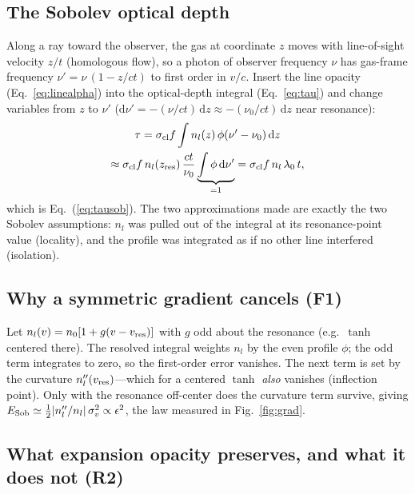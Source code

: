 \documentclass[fleqn,usenatbib]{mnras}
\begin{document}
\subsection{The Sobolev optical depth}
\label{app:sobolev}

Along a ray toward the observer, the gas at coordinate $z$ moves with
line-of-sight velocity $z/t$ (homologous flow), so a photon of observer
frequency $\nu$ has gas-frame frequency
$\nu' = \nu\,(1 - z/ct)$ to first order in $v/c$. Insert the line opacity
(Eq.~\ref{eq:linealpha}) into the optical-depth integral
(Eq.~\ref{eq:tau}) and change variables from $z$ to $\nu'$
($\mathrm{d}\nu' = -(\nu/ct)\,\mathrm{d}z \approx -(\nu_0/ct)\,\mathrm{d}z$
near resonance):
\begin{multline}
  \tau
  = \sigma_{\rm cl} f \int n_l(z)\, \phi(\nu'-\nu_0)\, \mathrm{d}z \\
  \approx
  \sigma_{\rm cl} f\, n_l(z_{\rm res})\, \frac{ct}{\nu_0}
  \underbrace{\int \phi\, \mathrm{d}\nu'}_{=1}
  = \sigma_{\rm cl} f\, n_l\, \lambda_0\, t ,
\end{multline}
which is Eq.~(\ref{eq:tausob}). The two approximations made are exactly the
two Sobolev assumptions: $n_l$ was pulled out of the integral at its
resonance-point value (locality), and the profile was integrated as if no
other line interfered (isolation).

\subsection{Why a symmetric gradient cancels (F1)}
\label{app:symmetry}

Let $n_l(v) = n_0[1 + g(v - v_{\rm res})]$ with $g$ odd about the resonance
(e.g.\ $\tanh$ centered there). The resolved integral weights $n_l$ by the
even profile $\phi$; the odd term integrates to zero, so the first-order
error vanishes. The next term is set by the curvature
$n_l''(v_{\rm res})$---which for a centered $\tanh$ \emph{also} vanishes
(inflection point). Only with the resonance off-center does the curvature
term survive, giving
$E_{\rm Sob} \simeq \tfrac12 |n_l''/n_l|\, \sigma_v^2 \propto \epsilon^2$,
the law measured in Fig.~\ref{fig:grad}.

\subsection{What expansion opacity preserves, and what it does not (R2)}
\label{app:expop}
\end{document}
